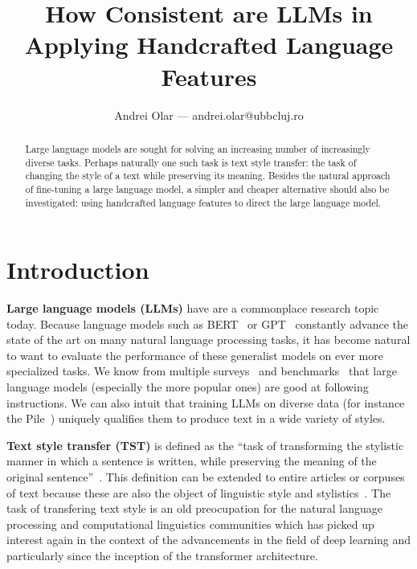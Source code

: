 \documentclass[runningheads,a4paper,11pt]{article}
\begin{document}
\title{How Consistent are LLMs in Applying Handcrafted Language Features}
\author{Andrei Olar --- andrei.olar@ubbcluj.ro}
\maketitle
\begin{abstract}
    Large language models are sought for solving an increasing number of
    increasingly diverse tasks. Perhaps naturally one such task is text style
    transfer: the task of changing the style of a text while preserving its
    meaning. Besides the natural approach of fine-tuning a large language model,
    a simpler and cheaper alternative should also be investigated: using
    handcrafted language features to direct the large language model.
\end{abstract}


\section{Introduction}\label{introduction}

\textbf{Large language models (LLMs)} have are a commonplace research topic
today.
Because language models such as BERT~\cite{devlin2018bert} or
GPT~\cite{gpt-2018,gpt2-2019,gpt3-2020} constantly advance the state of the art
on many natural language processing tasks, it has become natural to want to
evaluate the performance of these generalist models on ever more specialized
tasks.
We know from multiple surveys~\cite{minaee2024llmsurvey,zhao2023survey} and
benchmarks~\cite{papcode2024hellaswag,chiang2024chatbot} that large language
models (especially the more popular ones) are good at following instructions.
We can also intuit that training LLMs on diverse data (for instance the
Pile~\cite{gao2020pile}) uniquely qualifies them to produce text in a wide
variety of styles.

\textbf{Text style transfer (TST)} is defined as the ``task of transforming the
stylistic manner in which a sentence is written, while preserving the meaning of
the original sentence''~\cite{tst-review-2021}.
This definition can be extended to entire articles or corpuses of text because
these are also the object of linguistic style and
stylistics~\cite{lugea2023stylistics}.
The task of transfering text style is an old preocupation for the natural
language processing and computational linguistics communities which has picked
up interest again in the context of the advancements in the field of deep
learning and particularly since the inception of the transformer architecture.
\end{document}
